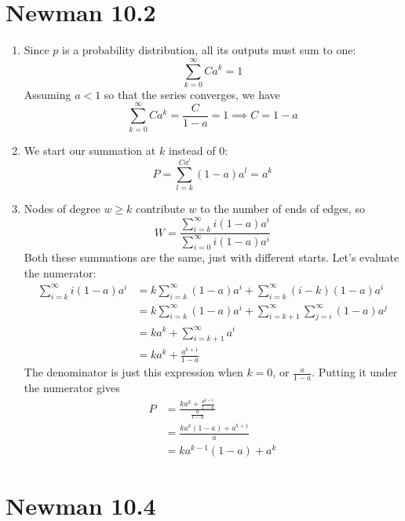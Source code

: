 \documentclass[12pt]{article}
\begin{document}
\section{Newman 10.2}\label{sec:p1}

\begin{enumerate}
      \item Since $p$ is a probability distribution, all its outputs must sum to one:
            \[\sum_{k=0}^{\infty} Ca^k=1\]
            Assuming $a < 1$ so that the series converges, we have
            \[\sum_{k=0}^{\infty} Ca^k=\frac{C}{1-a}=1 \implies \boxed{C=1-a}\]

      \item We start our summation at $k$ instead of $0$:
            \[P=\sum_{l=k}^{Ca^l} (1-a)a^l =\boxed{a^k}\]

      \item Nodes of degree $w \ge k$ contribute $w$ to the number of ends of edges, so
            \[W = \frac{\sum_{i=k}^{\infty} i(1-a)a^i}{\sum_{i=0}^{\infty} i(1-a)a^i}\]
            Both these summations are the same, just with different starts.
            Let's evaluate the numerator:
            \begin{align*}
                  \sum_{i=k}^{\infty} i(1-a)a^i
                   & = k\sum_{i=k}^{\infty} (1-a)a^i + \sum_{i=k}^{\infty} (i-k)(1-a)a^i                  \\
                   & = k\sum_{i=k}^{\infty} (1-a)a^i + \sum_{i=k+1}^{\infty} \sum_{j=i}^{\infty} (1-a)a^j \\
                   & = ka^k + \sum_{i=k+1}^{\infty} a^i                                                   \\
                   & = ka^k + \frac{a^{k+1}}{1-a}
            \end{align*}
            The denominator is just this expression when $k=0$, or $\frac{a}{1-a}$.
            Putting it under the numerator gives
            \begin{align*}
                  P
                   & = \frac{ka^k + \frac{a^{k+1}}{1-a}}{\frac{a}{1-a}} \\
                   & = \frac{ka^k(1-a)+a^{k+1}}{a}                      \\
                   & = \boxed{ka^{k-1}(1-a)+a^k}
            \end{align*}
\end{enumerate}

\section{Newman 10.4}
\end{document}
